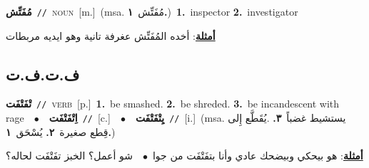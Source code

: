\documentclass[10pt,a4paper,twoside]{article} %
\begin{document}
\begin{multicols}{2}
{\setlength\topsep{0pt}\textbf{\foreignlanguage{arabic}{مُفَتِّش}}\ {\color{gray}\texttt{//}\color{black}}\ \textsc{noun}\ [m.]\ \color{gray}(msa. \foreignlanguage{arabic}{مُفَتِّش}~\foreignlanguage{arabic}{\textbf{١.}})\color{black}\ \textbf{1.}~inspector  \textbf{2.}~investigator\  \begin{flushright}\color{gray}\foreignlanguage{arabic}{\textbf{\underline{\foreignlanguage{arabic}{أمثلة}}}: أخده المُفَتِّش عغرفة تانية وهو ايديه مربطات}\end{flushright}\color{black}} \vspace{2mm}

\vspace{-3mm}
\subsection*{\color{blue}\foreignlanguage{arabic}{ف.ت.ف.ت}\color{blue}{}} 

{\setlength\topsep{0pt}\textbf{\foreignlanguage{arabic}{تْفَتْفَت}}\ {\color{gray}\texttt{//}\color{black}}\ \textsc{verb}\ [p.]\ \textbf{1.}~be smashed.  \textbf{2.}~be shreded.  \textbf{3.}~be incandescent with rage\ \ $\bullet$\ \ \setlength\topsep{0pt}\textbf{\foreignlanguage{arabic}{اِتْفَتْفَت}}\ {\color{gray}\texttt{//}\color{black}}\ [c.]\ \ $\bullet$\ \ \setlength\topsep{0pt}\textbf{\foreignlanguage{arabic}{يِتْفَتْفَت}}\ {\color{gray}\texttt{//}\color{black}}\ [i.]\ \color{gray}(msa. \foreignlanguage{arabic}{يستشيط غضباً}~\foreignlanguage{arabic}{\textbf{٣.}}  .\foreignlanguage{arabic}{يُقَطَّع إِلى قِطع صغيرة}~\foreignlanguage{arabic}{\textbf{٢.}}  \foreignlanguage{arabic}{يُسْحَق}~\foreignlanguage{arabic}{\textbf{١.}})\color{black}\  \begin{flushright}\color{gray}\foreignlanguage{arabic}{\textbf{\underline{\foreignlanguage{arabic}{أمثلة}}}: هو بيحكي وبيضحك عادي وأنا بتفَتْفَت من جوا\ $\bullet$\ \  شو أعمل؟ الخبز تفَتْفَت لحاله؟}\end{flushright}\color{black}} \vspace{2mm}


\end{multicols}
\end{document}
